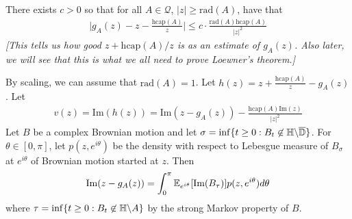 \documentclass[12pt,a4paper]{article}
\newenvironment{proof}
{\begin{changemargin}{0.5cm}{0.5cm} 
	}%
	{\end{changemargin}
}
\newenvironment{p}
{\begin{proof} 
	}%
	{\end{proof}
}
\begin{document}
\s

\prop There exists $c>0$ so that for all $A\in \mathscr{Q}$, $|z| \geq \text{rad}(A)$, have that
\begin{align*}
\Big|g_A(z) - z - \frac{\text{hcap}(A)}{z}\Big| \leq c \cdot \frac{\text{rad}(A) \text{hcap}(A)}{|z|^2}
\end{align*}
\emph{[This tells us how good $z+ \text{hcap}(A)/z$ is as an estimate of $g_A(z)$. Also later, we will see that this is what we all need to prove Loewner's theorem.]}
\begin{p}
\pf By scaling, we can assume that $\text{rad}(A)=1$. Let $h(z) = z+ \frac{\text{hcap}(A)}{z} - g_A(z)$. Let 
\begin{align*}
v(z) = \text{Im}(h(z)) = \text{Im}(z- g_A(z)) - \frac{\text{hcap}(A)\text{Im}(z)}{|z|^2}
\end{align*}
Let $B$ be a complex Brownian motion and let $\sigma = \inf \{t\geq 0: B_t \not\in \mathbb{H} \backslash \overline{\mathbb{D}}\}$. For $\theta \in [0, \pi]$, let $p(z, e^{i\theta})$ be the density with respect to Lebesgue measure of $B_{\sigma}$ at $e^{i\theta}$ of Brownian motion started at $z$. Then
\begin{align*}
\text{Im}(z- g_A(z)) = \int_0^{\pi} \mathbb{E}_{e^{i\theta}}[\text{Im}(B_{\tau})] p(z, e^{i\theta})d\theta
\end{align*}
where $\tau = \inf \{t\geq 0 : B_t \not\in \mathbb{H} \backslash A\}$ by the strong Markov property of $B$.


\end{p}
\end{document}
